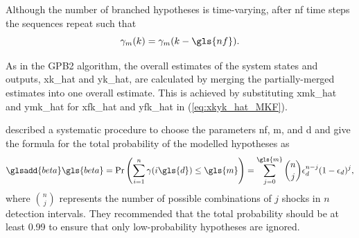 Although the number of branched hypotheses is time-varying, after \gls{nf} time steps the sequences repeat such that 
\begin{equation} \label{eq:rmkrmkmNf_SFex2}
	\mathbf{\gamma}_m(k) = \mathbf{\gamma}_m(k-\gls{nf}).
\end{equation}

As in the \gls{GPB2} algorithm, the overall estimates of the system states and outputs, \gls{xk_hat} and \gls{yk_hat}, are calculated by merging the partially-merged estimates into one overall estimate. This is achieved by substituting \gls{xmk_hat} and \gls{ymk_hat} for \gls{xfk_hat} and \gls{yfk_hat} in (\ref{eq:xkyk_hat_MKF}).

\cite{robertson_detection_1995} described a systematic procedure to choose the parameters \gls{nf}, \gls{m}, and \gls{d} and give the formula for the total probability of the modelled hypotheses as
\begin{equation} \label{eq:p_gamma}
	\glsadd{beta}\gls{beta}=\operatorname{Pr}\left(\sum_{i=1}^{n} \gamma(i \gls{d}) \leq \gls{m} \right) = \sum_{j=0}^{\gls{m}} \binom{n}{j} \epsilon_d^{n-j}(1-\epsilon_d)^{j},
\end{equation}
where $\binom{n}{j}$ represents the number of possible combinations of $j$ shocks in $n$ detection intervals. They recommended that the total probability should be at least 0.99 to ensure that only low-probability hypotheses are ignored.

